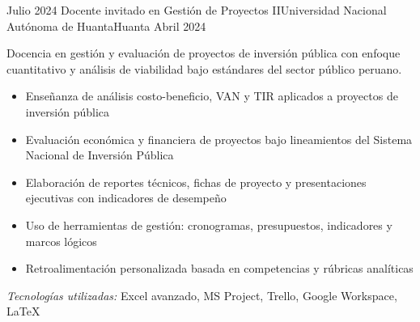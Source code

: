 \experience
{Julio 2024} {Docente invitado en Gestión de Proyectos II}{Universidad Nacional Autónoma de Huanta}{Huanta}
{Abril 2024} {
	Docencia en gestión y evaluación de proyectos de inversión pública con enfoque cuantitativo y análisis de viabilidad bajo estándares del sector público peruano.
	\begin{itemize}
		\item Enseñanza de análisis costo-beneficio, VAN y TIR aplicados a proyectos de inversión pública
		\item Evaluación económica y financiera de proyectos bajo lineamientos del Sistema Nacional de Inversión Pública
		\item Elaboración de reportes técnicos, fichas de proyecto y presentaciones ejecutivas con indicadores de desempeño
		\item Uso de herramientas de gestión: cronogramas, presupuestos, indicadores y marcos lógicos
		\item Retroalimentación personalizada basada en competencias y rúbricas analíticas
	\end{itemize}
}
{\footnotesize{\emph{Tecnologías utilizadas:} Excel avanzado, MS Project, Trello, Google Workspace, LaTeX}}
